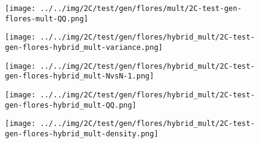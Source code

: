 \begin{figure}[H]
\centering	\texttt{[image: ../../img/2C/test/gen/flores/mult/2C-test-gen-flores-mult-QQ.png]}
\end{figure}
\begin{figure}[H]
\centering	\texttt{[image: ../../img/2C/test/gen/flores/hybrid\_mult/2C-test-gen-flores-hybrid\_mult-variance.png]}
\end{figure}
\begin{figure}[H]
\centering	\texttt{[image: ../../img/2C/test/gen/flores/hybrid\_mult/2C-test-gen-flores-hybrid\_mult-NvsN-1.png]}
\end{figure}
\begin{figure}[H]
\centering	\texttt{[image: ../../img/2C/test/gen/flores/hybrid\_mult/2C-test-gen-flores-hybrid\_mult-QQ.png]}
\end{figure}
\begin{figure}[H]
\centering	\texttt{[image: ../../img/2C/test/gen/flores/hybrid\_mult/2C-test-gen-flores-hybrid\_mult-density.png]}
\end{figure}
